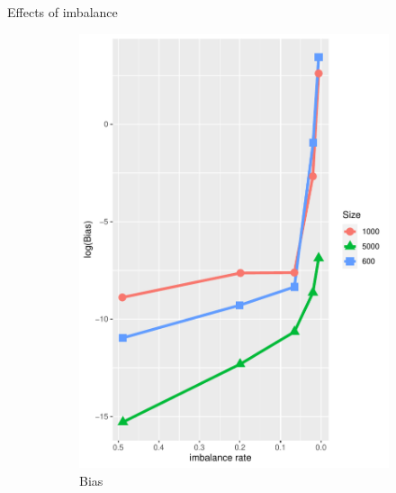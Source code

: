 \documentclass{beamer}
\begin{document}
    \begin{frame}{Effects of imbalance}
    \begin{figure}
	\centering
	\begin{subfigure}{0.47\textwidth}
		\includegraphics[width=\textwidth]{imbbias.pdf}
		\caption{Bias}
	\end{subfigure}
	\begin{subfigure}{0.47\textwidth}

\end{subfigure}
\end{figure}
\end{frame}
\end{document}
